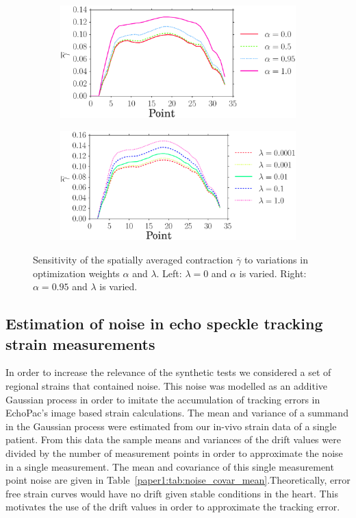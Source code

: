 \begin{figure}[htbp]
\centering
\begin{subfigure}[t]{0.49\textwidth}
     {\includegraphics[width=\textwidth]{mean_gamma_varying_alpha}}
     \caption*{\label{paper1:fig:gamma_sense_alpha}}
\end{subfigure}
\begin{subfigure}[t]{0.49\textwidth}
    {\includegraphics[width=\textwidth]{mean_gamma_varying_lambda}}
    \caption*{\label{paper1:fig:gamma_sense_lmbda}}
\end{subfigure}
\caption{Sensitivity of the spatially averaged contraction $\overline{\gamma}$ 
to variations in optimization weights $\alpha$ and $\lambda$. Left: $\lambda = 0$ and 
$\alpha$ is varied. Right: $\alpha = 0.95$ and $\lambda$ is varied.}
\label{paper1:fig:gamma_sense_alpha_lambda}
\end{figure}


\subsection{Estimation of noise in echo speckle tracking strain measurements}
\label{paper1:sec:strain_noise_est}
In order to increase the relevance of the synthetic tests we
considered a set of regional strains that contained noise. This
noise was modelled as an additive Gaussian process in order to imitate
the accumulation of tracking errors in EchoPac's image based strain
calculations. The mean and variance of a summand in the Gaussian
process were estimated from our in-vivo strain data of a single patient. From this data 
the sample means and variances of
the drift values were divided by the number of measurement points in order to approximate the noise in 
a single measurement. The mean and covariance of this single measurement point noise are given in
Table~\ref{paper1:tab:noise_covar_mean}.Theoretically, error free strain
curves would have no drift given stable conditions in the heart.
This motivates the use of the drift values in order to approximate 
the tracking error.

